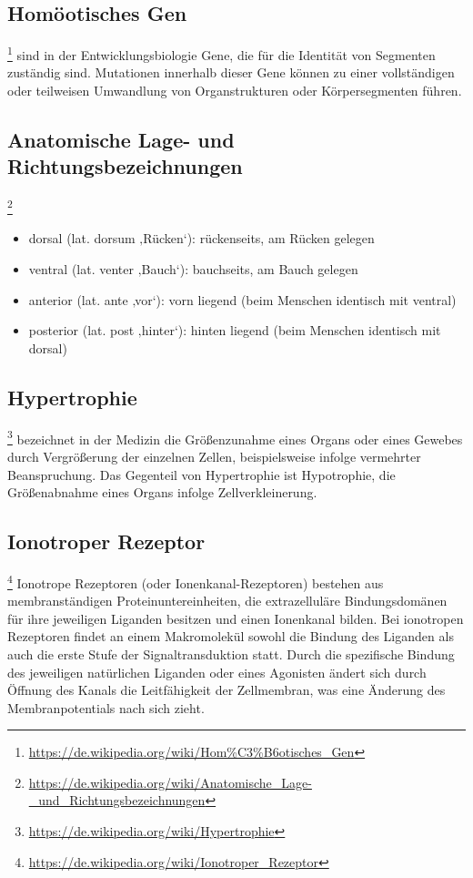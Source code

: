 \subsection{Homöotisches Gen}\footnote{\url{https://de.wikipedia.org/wiki/Hom\%C3\%B6otisches_Gen}}
sind in der Entwicklungsbiologie Gene, die für die Identität von Segmenten zuständig sind. Mutationen innerhalb dieser Gene können zu einer vollständigen oder teilweisen Umwandlung von Organstrukturen oder Körpersegmenten führen.

\subsection{Anatomische Lage- und Richtungsbezeichnungen}\footnote{\url{https://de.wikipedia.org/wiki/Anatomische_Lage-_und_Richtungsbezeichnungen}}
\begin{itemize}
	\item dorsal (lat. dorsum ‚Rücken‘): rückenseits, am Rücken gelegen
	\item ventral (lat. venter ‚Bauch‘): bauchseits, am Bauch gelegen
	\item anterior (lat. ante ‚vor‘): vorn liegend (beim Menschen identisch mit ventral)
	\item posterior (lat. post ‚hinter‘): hinten liegend (beim Menschen identisch mit dorsal)
\end{itemize}

\subsection{Hypertrophie}\footnote{\url{https://de.wikipedia.org/wiki/Hypertrophie}}
bezeichnet in der Medizin die Größenzunahme eines Organs oder eines Gewebes durch Vergrößerung der einzelnen Zellen, beispielsweise infolge vermehrter Beanspruchung. Das Gegenteil von Hypertrophie ist Hypotrophie, die Größenabnahme eines Organs infolge Zellverkleinerung.

\subsection{Ionotroper Rezeptor}\footnote{\url{https://de.wikipedia.org/wiki/Ionotroper_Rezeptor}}
Ionotrope Rezeptoren (oder Ionenkanal-Rezeptoren) bestehen aus membranständigen Proteinuntereinheiten, die extrazelluläre Bindungsdomänen für ihre jeweiligen Liganden besitzen und einen Ionenkanal bilden. Bei ionotropen Rezeptoren findet an einem Makromolekül sowohl die Bindung des Liganden als auch die erste Stufe der Signaltransduktion statt. Durch die spezifische Bindung des jeweiligen natürlichen Liganden oder eines Agonisten ändert sich durch Öffnung des Kanals die Leitfähigkeit der Zellmembran, was eine Änderung des Membranpotentials nach sich zieht.

